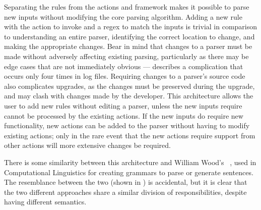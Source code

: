 Separating the rules from the actions and framework makes it possible to
parse new inputs without modifying the core parsing algorithm.  Adding a
new rule with the action to invoke and a regex to match the inputs is
trivial in comparison to understanding an entire parser, identifying the
correct location to change, and making the appropriate changes.  Bear in
mind that changes to a parser must be made without adversely affecting
existing parsing, particularly as there may be edge cases that are not
immediately obvious --- 
describes a complication that occurs only four times in \numberOFlogFILES{}
log files.  Requiring changes to a parser's source code also complicates
upgrades, as the changes must be preserved during the upgrade, and may
clash with changes made by the developer.  This architecture allows the
user to add new rules without editing a parser, unless the new inputs
require cannot be processed by the existing actions.  If the new inputs do
require new functionality, new actions can be added to the parser without
having to modify existing actions; only in the rare event that the new
actions require support from other actions will more extensive changes be
required.

There is some similarity between this architecture and William Wood's
~\cite{atns,nlpip}, used in Computational Linguistics for
creating grammars to parse or generate sentences.  The resemblance between
the two (shown in ) is accidental, but it is clear that the two different
approaches share a similar division of responsibilities, despite having
different semantics.


